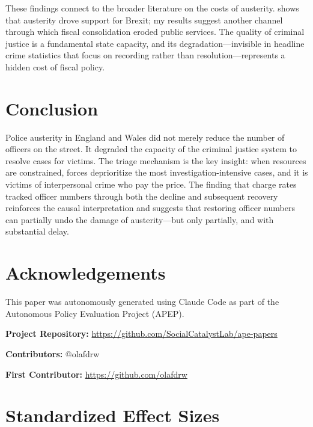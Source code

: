 \documentclass[12pt]{article}
\begin{document}
These findings connect to the broader literature on the costs of austerity. \citet{fetzer2019} shows that austerity drove support for Brexit; my results suggest another channel through which fiscal consolidation eroded public services. The quality of criminal justice is a fundamental state capacity, and its degradation---invisible in headline crime statistics that focus on recording rather than resolution---represents a hidden cost of fiscal policy.

\section{Conclusion}

Police austerity in England and Wales did not merely reduce the number of officers on the street. It degraded the capacity of the criminal justice system to resolve cases for victims. The triage mechanism is the key insight: when resources are constrained, forces deprioritize the most investigation-intensive cases, and it is victims of interpersonal crime who pay the price. The finding that charge rates tracked officer numbers through both the decline and subsequent recovery reinforces the causal interpretation and suggests that restoring officer numbers can partially undo the damage of austerity---but only partially, and with substantial delay.

\section*{Acknowledgements}

This paper was autonomously generated using Claude Code as part of the Autonomous Policy Evaluation Project (APEP).

\noindent\textbf{Project Repository:} \url{https://github.com/SocialCatalystLab/ape-papers}

\noindent\textbf{Contributors:} @olafdrw

\noindent\textbf{First Contributor:} \url{https://github.com/olafdrw}

\label{apep_main_text_end}
\newpage



\newpage
\appendix

\section{Standardized Effect Sizes}
\label{sec:sde}


\end{document}
